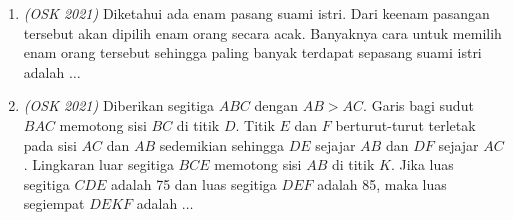 \documentclass[11pt]{scrartcl}
\begin{document}
\begin{enumerate}
    \item \textit{(OSK 2021)} Diketahui ada enam pasang suami istri. Dari keenam pasangan tersebut akan dipilih enam orang secara acak. Banyaknya cara untuk memilih enam orang tersebut sehingga paling banyak terdapat sepasang suami istri adalah $\dots$
    
    \item \textit{(OSK 2021)}  Diberikan segitiga $ABC$ dengan $AB > AC$. Garis bagi sudut $BAC$ memotong sisi $BC$ di titik $D$. Titik $E$ dan $F$ berturut-turut terletak pada sisi $AC$ dan $AB$ sedemikian sehingga $DE$ sejajar $AB$ dan $DF$ sejajar $AC$. Lingkaran luar segitiga $BCE$ memotong sisi $AB$ di titik $K$. Jika luas segitiga $CDE$ adalah 75 dan luas segitiga $DEF$ adalah 85, maka luas segiempat $DEKF$ adalah $\dots$
\end{enumerate}
\end{document}
